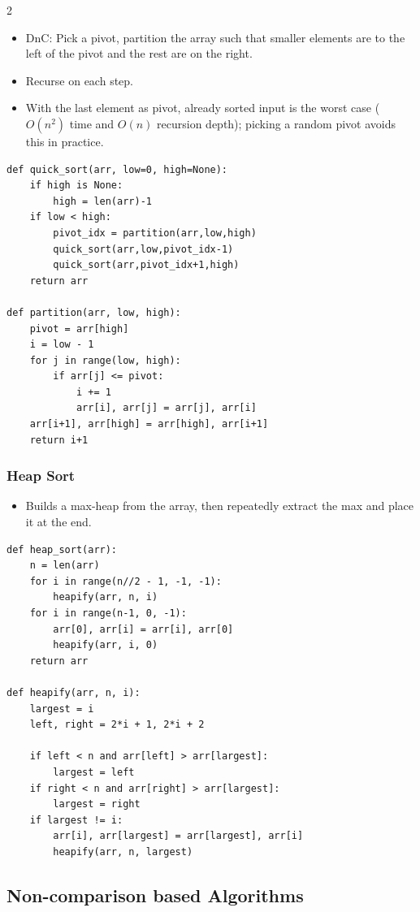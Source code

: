\documentclass[9pt,a4paper]{extarticle}
\begin{document}
\begin{multicols}{2}
\begin{itemize}
\item DnC: Pick a pivot, partition the array such that smaller elements are to the left of the pivot and the rest are on the right.
\item Recurse on each step.
\item With the last element as pivot, already sorted input is the worst case ($O(n^2)$ time and $O(n)$ recursion depth); picking a random pivot avoids this in practice.
\end{itemize}

\begin{lstlisting}
def quick_sort(arr, low=0, high=None):
    if high is None:
        high = len(arr)-1
    if low < high:
        pivot_idx = partition(arr,low,high)
        quick_sort(arr,low,pivot_idx-1)
        quick_sort(arr,pivot_idx+1,high)
    return arr

def partition(arr, low, high):
    pivot = arr[high]
    i = low - 1
    for j in range(low, high):
        if arr[j] <= pivot:
            i += 1
            arr[i], arr[j] = arr[j], arr[i]
    arr[i+1], arr[high] = arr[high], arr[i+1]
    return i+1
\end{lstlisting}

\subsubsection{Heap Sort}

\begin{itemize}
\item Builds a max-heap from the array, then repeatedly extract the max and place it at the end.
\end{itemize}

\begin{lstlisting}
def heap_sort(arr):
    n = len(arr)
    for i in range(n//2 - 1, -1, -1):
        heapify(arr, n, i)
    for i in range(n-1, 0, -1):
        arr[0], arr[i] = arr[i], arr[0]
        heapify(arr, i, 0)
    return arr

def heapify(arr, n, i):
    largest = i
    left, right = 2*i + 1, 2*i + 2

    if left < n and arr[left] > arr[largest]:
        largest = left
    if right < n and arr[right] > arr[largest]:
        largest = right
    if largest != i:
        arr[i], arr[largest] = arr[largest], arr[i]
        heapify(arr, n, largest)
\end{lstlisting}

\subsection{Non-comparison based Algorithms}


\end{multicols}
\end{document}
